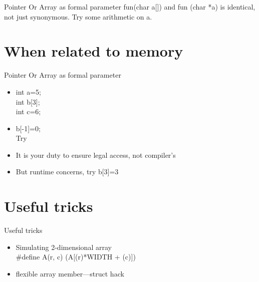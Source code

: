 \documentclass{beamer}
\begin{document}
\begin{frame}{Pointer Or Array as formal parameter}
fun(char a[]) and fun (char *a) is identical, not just synonymous.
Try some arithmetic on a.
\end{frame}


\section{When related to memory}

\begin{frame}{Pointer Or Array as formal parameter}
  \begin{itemize}
    \item <1-> 
    int a=5;\\
    int b[3];\\
    int c=6; 
    \item <2-> b[-1]=0;\\Try
    \item <3-> It is your duty to ensure legal access, not compiler's  
    \item <4-> But runtime concerns, try b[3]=3
  \end{itemize}

\end{frame}



\section{Useful tricks}
\begin{frame}{Useful tricks}
  \begin{itemize}
  \item Simulating 2-dimensional array\\ \#define A(r, c) (A[(r)*WIDTH + (c)])
  \item flexible array member---struct hack
  \end{itemize}
\end{frame}
\end{document}
